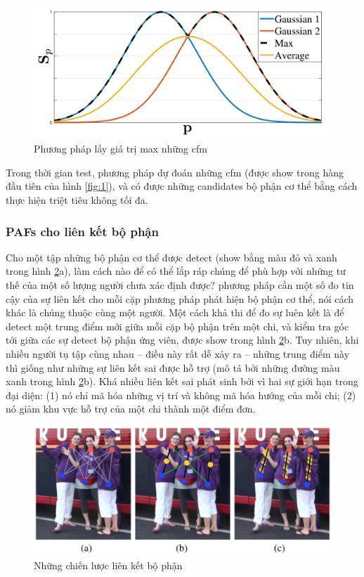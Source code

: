 \FloatBarrier
\begin{figure}[htp]
\begin{center}
\includegraphics[scale=0.3]{chap3/c3_figs/2.png}
\end{center}
\caption{Phương pháp lấy giá trị max những cfm}
\label{fig:2}
\end{figure}
\FloatBarrier

Trong thời gian test, phương pháp dự đoán những cfm (được show trong hàng đầu tiên của hình \ref{fig:1}), và có được những candidates bộ phận cơ thể bằng cách thực hiện triệt tiêu không tối đa.

\subsubsection{PAFs cho liên kết bộ phận}
Cho một tập những bộ phận cơ thể được detect (show bằng màu đỏ và xanh trong hình \ref{fig:3}a), làm cách nào để có thể lắp ráp chúng để phù hợp với những tư thế của một số lượng người chưa xác định được? phương pháp cần một số đo tin cậy của sự liên kết cho mỗi cặp phương pháp phát hiện bộ phận cơ thể, nói cách khác là chúng thuộc cùng một người. Một cách khả thi để đo sự luên kết là để detect một trung điểm mới giữa mỗi cặp bộ phận trên một chi, và kiểm tra góc tới giữa các sự detect bộ phận ứng viên, được show trong hình \ref{fig:3}b. Tuy nhiên, khi nhiều người tụ tập cùng nhau – điều này rất dễ xảy ra – những trung điểm này thì giống như những sự liên kết sai được hỗ trợ (mô tả bởi những đường màu xanh trong hình \ref{fig:3}b). Khá nhiều liên kết sai phát sinh bởi vì hai sự giới hạn trong đại diện: (1) nó chỉ mã hóa những vị trí và không mã hóa hướng của mỗi chi; (2) nó giảm khu vực hỗ trợ của một chi thành một điểm đơn.

\FloatBarrier
\begin{figure}[htp]
\begin{center}
\includegraphics[scale=0.3]{chap3/c3_figs/3.png}
\end{center}
\caption{Những chiến lược liên kết bộ phận}
\label{fig:3}
\end{figure}
\FloatBarrier

